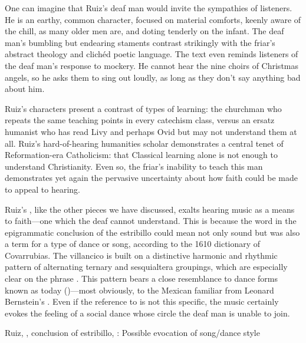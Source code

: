 One can imagine that Ruiz's deaf man would invite the sympathies of listeners.
He is an earthy, common character, focused on material comforts, keenly aware of
the chill, as many older men are, and doting tenderly on the infant.
The deaf man's bumbling but endearing staments contrast strikingly with the 
friar's abstract theology and clichéd poetic language.
The text even reminds listeners of the deaf man's response to mockery.
He cannot hear the nine choirs of Christmas angels, so he asks them to sing out 
loudly, as long as they don't say anything bad about him.

Ruiz's characters present a contrast of types of learning: the churchman who 
repeats the same teaching points in every catechism class, versus an ersatz 
humanist who has read Livy and perhaps Ovid but may not understand them at all.
Ruiz's hard-of-hearing humanities scholar demonstrates a central tenet of 
Reformation-era Catholicism: that Classical learning alone is not enough to 
understand Christianity.%
    \Autocite
    [206, .]
    {Erasmus:Dolan}
Even so, the friar's inability to teach this man demonstrates yet again the 
pervasive uncertainty about how faith could be made to appeal to hearing.

Ruiz's , like the other pieces we have 
discussed, exalts hearing music as a means to faith---one which the deaf cannot 
understand.
This is because the word  in the epigrammatic conclusion of the 
estribillo could mean not only sound but was also a term for a type of dance or 
song, according to the 1610 dictionary of Covarrubias.
The villancico is built on a distinctive harmonic and rhythmic pattern of 
alternating ternary and sesquialtera groupings, which are especially clear on 
the phrase .
This pattern bears a close resemblance to dance forms known as  today 
()---most obviously, to the Mexican 
 familiar from Leonard Bernstein's .%
    \Autocite[]{Grove}
Even if the reference to  is not this specific, the music certainly 
evokes the feeling of a social dance whose circle the deaf man is unable to 
join.


\begin{exmusic}
    \caption{Ruiz, , conclusion of 
    estribillo, : Possible evocation of  song/dance 
    style}
    \label{exmusic:Ruiz-Sordos-son}
\end{exmusic}

